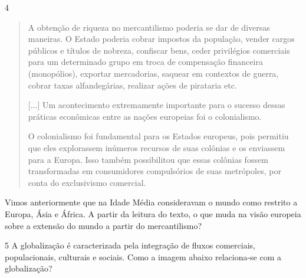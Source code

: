 \num{4}

\begin{quote}
A obtenção de riqueza no mercantilismo poderia se dar de diversas
maneiras. O Estado poderia cobrar impostos da população, vender cargos
públicos e títulos de nobreza, confiscar bens, ceder privilégios
comerciais para um determinado grupo em troca de compensação financeira
(monopólios), exportar mercadorias, saquear em contextos de guerra,
cobrar taxas alfandegárias, realizar ações de pirataria
etc.

{[}...{]} Um acontecimento extremamente importante para o sucesso
dessas práticas econômicas entre as nações europeias foi o
colonialismo.

O colonialismo foi fundamental para os Estados europeus, pois
permitiu que eles explorassem inúmeros recursos de suas colônias e os
enviassem para a Europa. Isso também possibilitou que essas colônias
fossem transformadas em consumidores compulsórios de suas metrópoles,
por conta do exclusivismo comercial.

\end{quote}

Vimos anteriormente que na Idade Média consideravam o mundo como
restrito a Europa, Ásia e África. A partir da leitura do texto, o que
muda na visão europeia sobre a extensão do mundo a partir do
mercantilismo?



\num{5} A globalização é caracterizada pela integração de fluxos comerciais,
populacionais, culturais e sociais. Como a imagem abaixo relaciona-se
com a globalização?


